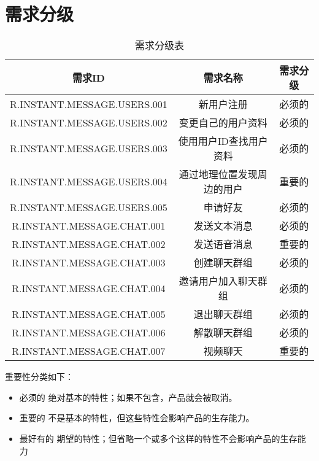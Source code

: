 \chapter{需求分级}
\begin{table}[htbp]
\centering
\caption{需求分级表} \label{tab:classification}
\begin{tabular}{|c|c|c|}
    \hline
    需求ID & 需求名称 & 需求分级 \\
    \hline
    R.INSTANT.MESSAGE.USERS.001 & 新用户注册 & 必须的 \\
    \hline
    R.INSTANT.MESSAGE.USERS.002 & 变更自己的用户资料 & 必须的 \\
    \hline
    R.INSTANT.MESSAGE.USERS.003 & 使用用户ID查找用户资料 & 必须的 \\
    \hline
    R.INSTANT.MESSAGE.USERS.004 & 通过地理位置发现周边的用户 & 重要的 \\
    \hline
    R.INSTANT.MESSAGE.USERS.005 & 申请好友 & 必须的 \\
    \hline
    R.INSTANT.MESSAGE.CHAT.001 & 发送文本消息 & 必须的 \\
    \hline
    R.INSTANT.MESSAGE.CHAT.002 & 发送语音消息 & 重要的 \\
    \hline
    R.INSTANT.MESSAGE.CHAT.003 & 创建聊天群组 & 必须的 \\
    \hline
    R.INSTANT.MESSAGE.CHAT.004 & 邀请用户加入聊天群组 & 必须的 \\
    \hline
    R.INSTANT.MESSAGE.CHAT.005 & 退出聊天群组 & 必须的 \\
    \hline
    R.INSTANT.MESSAGE.CHAT.006 & 解散聊天群组 & 必须的 \\
    \hline
    R.INSTANT.MESSAGE.CHAT.007 & 视频聊天 & 重要的 \\
    \hline
\end{tabular}
\end{table}


重要性分类如下：
\begin{itemize}
\item 必须的		绝对基本的特性；如果不包含，产品就会被取消。
\item 重要的		不是基本的特性，但这些特性会影响产品的生存能力。
\item 最好有的		期望的特性；但省略一个或多个这样的特性不会影响产品的生存能力
\end{itemize}
